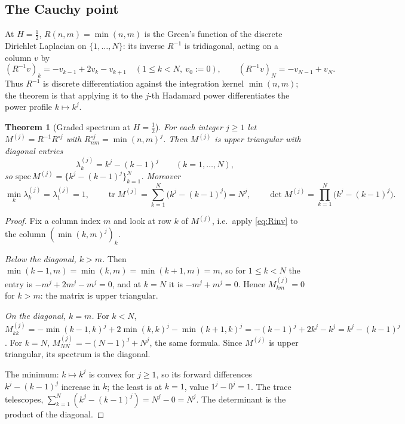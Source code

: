 \documentclass[11pt,reqno]{amsart}
\theoremstyle{plain}
\newtheorem{theorem}{Theorem}[section]
\theoremstyle{definition}
\theoremstyle{remark}
\newcommand{\Had}{\circ}
\DeclareMathOperator{\tr}{tr}
\begin{document}
\subsection{The Cauchy point}
At $H=\tfrac12$, $R(n,m)=\min(n,m)$ is the Green's function of the
discrete Dirichlet Laplacian on $\{1,\dots,N\}$: its inverse
$R^{-1}$ is tridiagonal, acting on a column $v$ by
\begin{equation}\label{eq:Rinv}
   (R^{-1}v)_k=-v_{k-1}+2v_k-v_{k+1}\quad(1\le k<N,\ v_0:=0),
   \qquad (R^{-1}v)_N=-v_{N-1}+v_N .
\end{equation}
Thus $R^{-1}$ is discrete differentiation against the integration
kernel $\min(n,m)$; the theorem is that applying it to the $j$-th
Hadamard power differentiates the power profile $k\mapsto k^j$.

\begin{theorem}[Graded spectrum at $H=\tfrac12$]\label{thm:graded}
For each integer $j\ge1$ let $M^{(j)}=R^{-1}R^{\Had j}$ with
$R^{\Had j}_{nm}=\min(n,m)^j$. Then $M^{(j)}$ is upper triangular with
diagonal entries
\[
   \lambda^{(j)}_k=k^{j}-(k-1)^{j}\qquad(k=1,\dots,N),
\]
so $\mathrm{spec}\,M^{(j)}=\{k^j-(k-1)^j\}_{k=1}^N$. Moreover
\[
   \min_k\lambda^{(j)}_k=\lambda^{(j)}_1=1,\qquad
   \tr M^{(j)}=\sum_{k=1}^N\bigl(k^j-(k-1)^j\bigr)=N^{j},\qquad
   \det M^{(j)}=\prod_{k=1}^N\bigl(k^j-(k-1)^j\bigr).
\]
\end{theorem}

\begin{proof}
Fix a column index $m$ and look at row $k$ of $M^{(j)}$, i.e.\ apply
\eqref{eq:Rinv} to the column $(\min(k,m)^j)_k$.

\emph{Below the diagonal, $k>m$.} Then $\min(k-1,m)=\min(k,m)=\min(k+1,m)=m$,
so for $1\le k<N$ the entry is $-m^j+2m^j-m^j=0$, and at $k=N$ it is
$-m^j+m^j=0$. Hence $M^{(j)}_{km}=0$ for $k>m$: the matrix is upper
triangular.

\emph{On the diagonal, $k=m$.} For $k<N$,
$M^{(j)}_{kk}=-\min(k-1,k)^j+2\min(k,k)^j-\min(k+1,k)^j
=-(k-1)^j+2k^j-k^j=k^j-(k-1)^j$. For $k=N$,
$M^{(j)}_{NN}=-(N-1)^j+N^j$, the same formula. Since $M^{(j)}$ is upper
triangular, its spectrum is the diagonal.

The minimum: $k\mapsto k^j$ is convex for $j\ge1$, so its forward
differences $k^j-(k-1)^j$ increase in $k$; the least is at $k=1$, value
$1^j-0^j=1$. The trace telescopes, $\sum_{k=1}^N(k^j-(k-1)^j)=N^j-0=N^j$.
The determinant is the product of the diagonal.
\end{proof}
\end{document}
